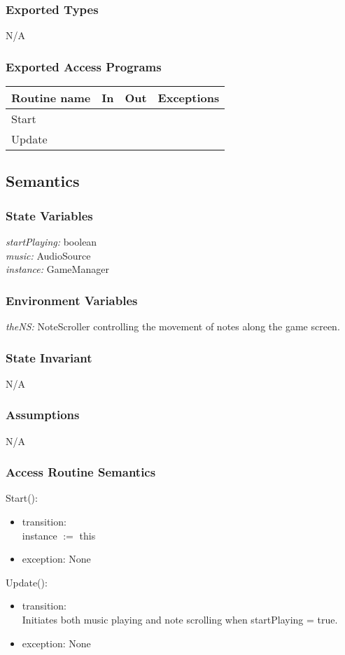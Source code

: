 \documentclass[12pt]{article}
\begin{document}
\subsubsection{Exported Types}
N/A

\subsubsection{Exported Access Programs}
\begin{tabular}{| l | l | l | l |}
\hline
\textbf{Routine name} & \textbf{In} & \textbf{Out} & \textbf{Exceptions}\\
\hline
Start    &      &           &          \\
\hline
Update   &     &           &          \\
\hline
\end{tabular}

\subsection{Semantics}
\subsubsection{State Variables}
\textit{startPlaying:} boolean\\
\textit{music:} AudioSource\\
\textit{instance:} GameManager

\subsubsection{Environment Variables}
\textit{theNS:} NoteScroller controlling the movement of notes along the game screen.

\subsubsection{State Invariant}
N/A

\subsubsection{Assumptions}
N/A

\subsubsection{Access Routine Semantics}
\noindent Start():
\begin{itemize}
	\item transition:\\
	    instance $:=$ this
	\item exception: None
\end{itemize}
\noindent Update():
\begin{itemize}
	\item transition:\\
	    Initiates both music playing and note scrolling when startPlaying = true.
	\item exception: None
\end{itemize}
\end{document}

